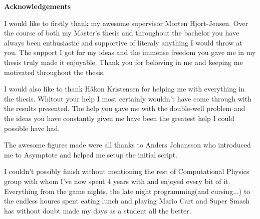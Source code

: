 \thispagestyle{empty}
\clearpage

\begin{center}
    \textbf{\Large{Acknowledgements}}\\ \vspace{0.6cm}
\end{center}
    I would like to firstly thank my awesome supervisor Morten Hjort-Jensen.
    Over the course of both my Master's thesis and throughout the bachelor you
    have always been enthusiastic and supportive of literaly anything I would
    throw at you. The support I got for my ideas and the immense freedom you
    gave me in my thesis truly made it enjoyable. Thank you for believing in me
    and keeping me motivated throughout the thesis.

    I would also like to thank Håkon Kristensen for helping me with everything
    in the thesis. Whitout your help I most certainly wouldn't have come
    through with the results presented. The help you gave me with the
    double-well problem and the ideas you have constantly given me have been
    the greatest help I could possible have had.

    The awesome figures made were all thanks to Anders Johansson who introduced
    me to Asymptote and helped me setup the initial script.

    I couldn't possibly finish without mentioning the rest of Computational
    Physics group with whom I've now spent 4 years with and enjoyed every bit
    of it. Everything from the game nights, the late night programming(and
    cursing...) to the endless houres spent eating lunch and playing Mario Cart
    and Super Smash has without doubt made my days as a student all the better.
\thispagestyle{empty}
\clearpage

{%
    \tableofcontents
    \thispagestyle{empty}
    \clearpage}%

\thispagestyle{empty}
\clearpage

